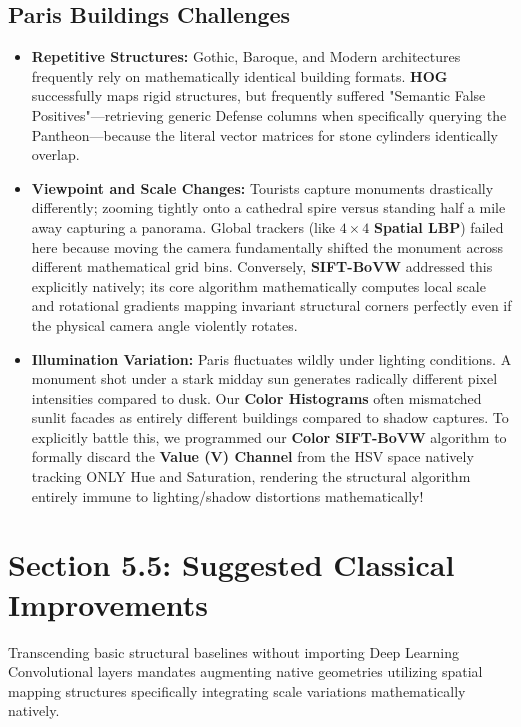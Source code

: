 \documentclass[11pt, a4paper]{article}
\begin{document}
\subsection{Paris Buildings Challenges}
\begin{itemize}
    \item \textbf{Repetitive Structures:} Gothic, Baroque, and Modern architectures frequently rely on mathematically identical building formats. \textbf{HOG} successfully maps rigid structures, but frequently suffered "Semantic False Positives"—retrieving generic Defense columns when specifically querying the Pantheon—because the literal vector matrices for stone cylinders identically overlap.
    \item \textbf{Viewpoint and Scale Changes:} Tourists capture monuments drastically differently; zooming tightly onto a cathedral spire versus standing half a mile away capturing a panorama. Global trackers (like $4\times 4$ \textbf{Spatial LBP}) failed here because moving the camera fundamentally shifted the monument across different mathematical grid bins. Conversely, \textbf{SIFT-BoVW} addressed this explicitly natively; its core algorithm mathematically computes local scale and rotational gradients mapping invariant structural corners perfectly even if the physical camera angle violently rotates.
    \item \textbf{Illumination Variation:} Paris fluctuates wildly under lighting conditions. A monument shot under a stark midday sun generates radically different pixel intensities compared to dusk. Our \textbf{Color Histograms} often mismatched sunlit facades as entirely different buildings compared to shadow captures. To explicitly battle this, we programmed our \textbf{Color SIFT-BoVW} algorithm to formally discard the \textbf{Value (V) Channel} from the HSV space natively tracking ONLY Hue and Saturation, rendering the structural algorithm entirely immune to lighting/shadow distortions mathematically!
\end{itemize}

\section{Section 5.5: Suggested Classical Improvements}
Transcending basic structural baselines without importing Deep Learning Convolutional layers mandates augmenting native geometries utilizing spatial mapping structures specifically integrating scale variations mathematically natively.
\end{document}
